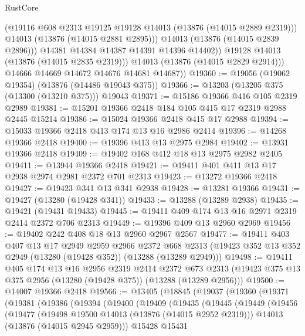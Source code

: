 \begin{lexlean}{RustCore}
\begin{coremodule}
                    (@19116 @608 @2313 @19125 @19128 @14013 (@13876 (@14015 @2889 @2319)))
                    @14013
                    (@13876 (@14015 @2881 @2895)))
                  @14013
                  (@13876 (@14015 @2839 @2896)))
                @14381
                @14384
                @14387
                @14391
                @14396
                @14402))
            @19128
            @14013
            (@13876 (@14015 @2835 @2319)))
          @14013
          (@13876 (@14015 @2829 @2914)))
        @14666
        @14669
        @14672
        @14676
        @14681
        @14687))
@19360 := @19056 (@19062 @19354) (@13876 (@14486 @19043 @375))
@19366 := @13203 (@13205 @375 (@13300 (@13210 @375))) @19043
@19371 := @15186 @19366 @416 @105 @2319 @2989
@19381 := @15201 @19366 @2418 @184 @105 @415 @17 @2319 @2988 @2445 @15214
@19386 := @15024 @19366 @2418 @415 @17 @2988
@19394 := @15033 @19366 @2418 @413 @174 @13 @16 @2986 @2414
@19396 := @14268 @19366 @2418
@19400 := @19396 @413 @13 @2975 @2984
@19402 := @13931 @19366 @2418
@19409 := @19402 @168 @412 @18 @13 @2975 @2982 @2405
@19411 := @13944 @19366 @2418
@19421 := @19411 @401 @411 @13 @17 @2938 @2974 @2981 @2372 @701 @2313
@19423 := @13272 @19366 @2418
@19427 := @19423 @341 @13 @341 @2938
@19428 := @13281 @19366
@19431 := @19427 (@13280 (@19428 @341))
@19433 := @13288 (@13289 @2938)
@19435 := @19421 (@19431 @19433)
@19445 := @19411 @409 @174 @13 @16 @2971 @2319 @2414 @2372 @706 @2313
@19449 := @19396 @409 @13 @2960 @2969
@19456 := @19402 @242 @408 @18 @13 @2960 @2967 @2567
@19477 := @19411
    @403
    @407
    @13
    @17
    @2949
    @2959
    @2966
    @2372
    @668
    @2313
    (@19423 @352 @13 @352 @2949 (@13280 (@19428 @352)) (@13288 (@13289 @2949)))
@19498 := @19411
    @405
    @174
    @13
    @16
    @2956
    @2319
    @2414
    @2372
    @673
    @2313
    (@19423 @375 @13 @375 @2956 (@13280 (@19428 @375)) (@13288 (@13289 @2956)))
@19500 := @14007 @19366 @2418
@19566 := @13405
    (@18845
      (@19037
        (@19360
          (@19371
            (@19381
              (@19386
                (@19394
                  (@19400
                    (@19409
                      (@19435
                        (@19445
                          (@19449
                            (@19456
                              (@19477
                                (@19498 @19500 @14013 (@13876 (@14015 @2952 @2319)))
                                @14013
                                (@13876 (@14015 @2945 @2959)))
                              @15428
                              @15431

\end{coremodule}
\end{lexlean}
